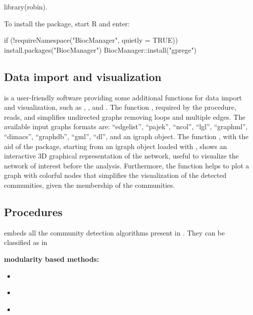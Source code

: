 \begin{example}
library(robin). 
\end{example}

To install the  package, start R and enter: 

\begin{example}
if (!requireNamespace("BiocManager", quietly = TRUE)) 
       install.packages("BiocManager")
BiocManager::install("gprege")
\end{example}

\subsection{Data import and visualization}
 is a user-friendly software providing some additional functions for data import and visualization, such as , , and . 
The function , required by the procedure, reads, and simplifies undirected graphs removing loops and multiple edges. The available input graphs formats are: ``edgelist'', ``pajek'', ``ncol'', ``lgl'', ``graphml'', ``dimacs'', ``graphdb'', ``gml'', ``dl'', and an igraph object.
The function , with the aid of the  package, starting from an igraph object loaded with , shows an interactive 3D graphical representation of the network, useful to visualize the network of interest before the analysis. Furthermore, the function  helps to plot a graph with colorful nodes that simplifies the visualization of the detected communities, given the membership of the communities.

\subsection{Procedures} 	
 embeds all the community detection algorithms present in . They can be classified as in \citep{Fortunato:2009}

\textbf{modularity based methods:}

\begin{itemize}

\item {} \citep{Clauset:2005}

\item {} \citep{Newman:2006}

\item {} \citep{Blondel:2008}

\end{itemize}

